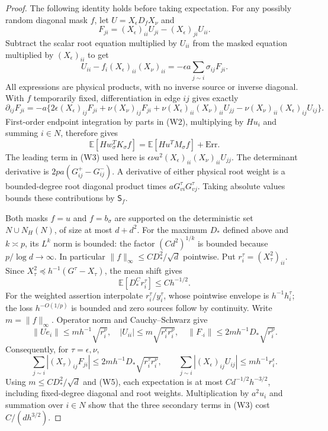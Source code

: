 \documentclass[10pt]{article}
\numberwithin{equation}{section}
\newcommand{\1}{\mathbf1}
\begin{document}
\begin{proof}
The following identity holds before taking expectation. For any
possibly random diagonal mask $f$, let $U=X_\epsilon D_fX_\nu$ and
\[
 F_{ji}=(X_\epsilon)_{ii}U_{ji}-(X_\epsilon)_{ji}U_{ii}.
\]
Subtract the scalar root equation multiplied by $U_{ii}$ from the
masked equation multiplied by $(X_\epsilon)_{ii}$ to get
\[
 U_{ii}-f_i(X_\epsilon)_{ii}(X_\nu)_{ii}
       =-\epsilon a\sum_{j\sim i}\sigma_{ij}F_{ji}.       \tag{W2}
\]
All expressions are physical products, with no inverse source or
inverse diagonal. With $f$ temporarily fixed, differentiation in
edge $ij$ gives exactly
\[
 \partial_{ij}F_{ji}=-a\{2\epsilon(X_\epsilon)_{ij}F_{ji}
 +\nu(X_\nu)_{ij}F_{ji}
 +\nu(X_\epsilon)_{ii}(X_\nu)_{ii}U_{jj}
 -\nu(X_\nu)_{ii}(X_\epsilon)_{ij}U_{ij}\}.              \tag{W3}
\]
First-order endpoint integration by parts in (W2), multiplying by
$Hu_i$ and summing $i\in N$, therefore gives
\[
 \mathbb E[H w_\sigma^TK_\sigma f]
       =\mathbb E[H u^TM_\sigma f]+\mathrm{Err}.           \tag{W4}
\]
The leading term in (W3) used here is
$\epsilon\nu a^2(X_\epsilon)_{ii}(X_\nu)_{ii}U_{jj}$.
The determinant derivative is $2pa(G^+_{ij}-G^-_{ij})$.
A derivative of either physical root weight is a bounded-degree
root diagonal product times $aG^\tau_{vi}G^\tau_{vj}$.
Taking absolute values bounds these contributions by $\mathsf S_f$.

Both masks $f=u$ and $f=b_\sigma$ are supported on the deterministic
set $N\cup N_H(N)$, of size at most $d+d^2$.
For the maximum $D_*$ defined above and $k\asymp p$, its
$L^k$ norm is bounded: the factor $(Cd^2)^{1/k}$ is bounded because
$p/\log d\to\infty$. In particular
$\|f\|_\infty\le CD_*^2/\sqrt d$ pointwise.
Put $r_i^\tau=(X_\tau^2)_{ii}$.
Since $X_\tau^2\preceq h^{-1}(G^\tau-X_\tau)$, the mean shift gives
\[
 \mathbb E[D_*^C r_i^\tau]\le Ch^{-1/2}.
 \tag{W5}
\]
For the weighted assertion interpolate $r_i^\tau/y_i^\tau$,
whose pointwise envelope is $h^{-1}h_i^\tau$; the loss
$h^{-O(1/p)}$ is bounded and zero sources follow by continuity.
Write $m=\|f\|_\infty$. Operator norm and Cauchy--Schwarz give
\[
 \|Ue_i\|\le mh^{-1}\sqrt{r_i^\nu},\quad
 |U_{ii}|\le m\sqrt{r_i^\epsilon r_i^\nu},\quad
 \|F_{\cdot i}\|\le2mh^{-1}D_*\sqrt{r_i^\nu}.
\]
Consequently, for $\tau=\epsilon,\nu$,
\[
 \sum_{j\sim i}|(X_\tau)_{ij}F_{ji}|
 \le2mh^{-1}D_*\sqrt{r_i^\tau r_i^\nu},\qquad
 \sum_{j\sim i}|(X_\epsilon)_{ij}U_{ij}|
 \le mh^{-1}r_i^\epsilon.
\]
Using $m\le CD_*^2/\sqrt d$ and (W5), each expectation is at most
$Cd^{-1/2}h^{-3/2}$, including fixed-degree diagonal and root weights.
Multiplication by $a^2u_i$ and summation over $i\in N$ show that the
three secondary terms in (W3) cost $C/(dh^{3/2})$.


\end{proof}
\end{document}
